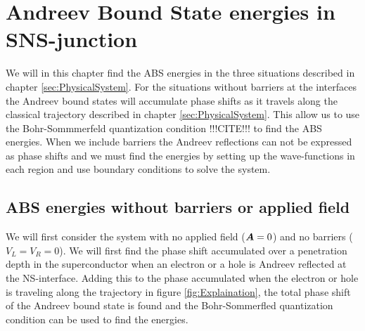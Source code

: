 \chapter{Andreev Bound State energies in SNS-junction}
\label{sec:energies}
We will in this chapter find the ABS energies in the three situations described in chapter \ref{sec:PhysicalSystem}. For the situations without barriers at the interfaces the Andreev bound states will accumulate phase shifts as it travels along the classical trajectory described in chapter \ref{sec:PhysicalSystem}. This allow us to use the Bohr-Sommmerfeld quantization condition !!!CITE!!! to find the ABS energies. When we include barriers the Andreev reflections can not be expressed as phase shifts and we must find the energies by setting up the wave-functions in each region and use boundary conditions to solve the system. 

\section{ABS energies without barriers or applied field}
\label{sec:without}
We will first consider the system with no applied field ($\boldsymbol{A}=0$) and no barriers ($V_L = V_R = 0$). We will first find the phase shift accumulated over a penetration depth in the superconductor when an electron or a hole is Andreev reflected at the NS-interface. Adding this to the phase accumulated when the electron or hole is traveling along the trajectory in figure \ref{fig:Explaination}, the total phase shift of the Andreev bound state is found and the Bohr-Sommerfled quantization condition can be used to find the energies.  

